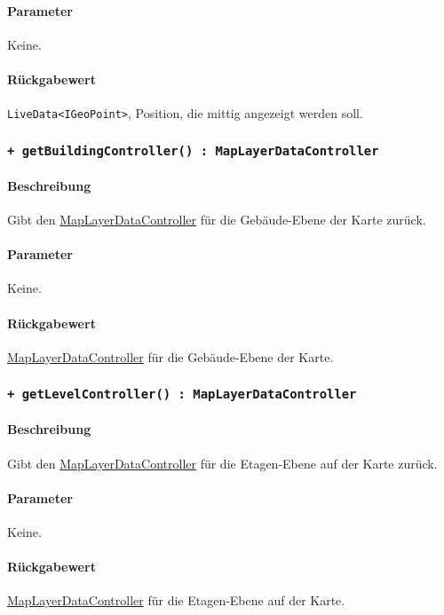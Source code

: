 \paragraph*{Parameter}
Keine.
\paragraph*{Rückgabewert}
\texttt{LiveData<IGeoPoint>}, Position, die mittig angezeigt werden soll.

\subsubsection*{\texttt{+ getBuildingController() : MapLayerDataController}}\label{App_Map_ViewModel_getBuildingController}%
\paragraph*{Beschreibung}
Gibt den \hyperref[App_Map_ViewModel_MapLayerDataController]{MapLayerDataController} für die Gebäude-Ebene der Karte zurück.
\paragraph*{Parameter}
Keine.
\paragraph*{Rückgabewert}
\hyperref[App_Map_ViewModel_MapLayerDataController]{MapLayerDataController} für die Gebäude-Ebene der Karte.

\subsubsection*{\texttt{+ getLevelController() : MapLayerDataController}}\label{App_Map_ViewModel_getLevelController}%
\paragraph*{Beschreibung}
Gibt den \hyperref[App_Map_ViewModel_MapLayerDataController]{MapLayerDataController} für die Etagen-Ebene auf der Karte zurück.
\paragraph*{Parameter}
Keine.
\paragraph*{Rückgabewert}
\hyperref[App_Map_ViewModel_MapLayerDataController]{MapLayerDataController} für die Etagen-Ebene auf der Karte.

